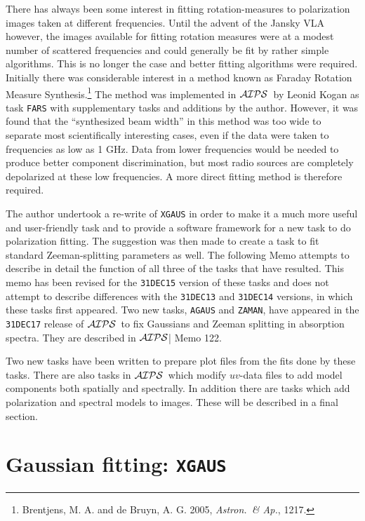 \documentclass[twoside]{article}
\newcommand{\Hi}[1]{\textcolor{hicol}{#1}}
\newcommand{\AIPS}{{$\cal AIPS\/$}}
\newcommand{\keyw}[1]{\hbox{{\tt #1}}}
\begin{document}
There has always been some interest in fitting rotation-measures to
polarization images taken at different frequencies.  Until the advent
of the Jansky VLA however, the images available for fitting rotation
measures were at a modest number of scattered frequencies and could
generally be fit by rather simple algorithms.  This is no longer the
case and better fitting algorithms were required.  Initially there was
considerable interest in a method known as Faraday Rotation Measure
Synthesis.\footnote{Brentjens, M. A. and de Bruyn, A. G. 2005, {\it
Astron.\ \& Ap.}, 1217.}  The method was implemented in \AIPS\ by
Leonid Kogan as task \keyw{FARS} with supplementary tasks and
additions by the author.  However, it was found that the ``synthesized
beam width'' in this method was too wide to separate most
scientifically interesting cases, even if the data were taken to
frequencies as low as 1 GHz.  Data from lower frequencies would be
needed to produce better component discrimination, but most radio
sources are completely depolarized at these low frequencies.  A more
direct fitting method is therefore required.

The author undertook a re-write of \keyw{XGAUS} in order to make it a
much more useful and user-friendly task and to provide a software
framework for a new task to do polarization fitting.  The suggestion
was then made to create a task to fit standard Zeeman-splitting
parameters as well.  The following Memo attempts to describe in detail
the function of all three of the tasks that have resulted.  This memo
\Hi{has been revised for the {\tt 31DEC15}} version of these tasks and
does not attempt to describe differences with the {\tt 31DEC13}
\Hi{and {\tt 31DEC14} versions}, in which these tasks first appeared.
\Hi{Two new tasks, {\tt AGAUS} and {\tt ZAMAN}, have appeared in the
  {\tt 31DEC17} release of \AIPS\ to fix Gaussians and Zeeman
  splitting in absorption spectra.  They are described in \AIPS| Memo
  122.}

\Hi{Two new tasks have been written to prepare plot files from the
fits done by these tasks.}  There are also tasks in \AIPS\ which
modify $uv$-data files to add model components both spatially and
spectrally.  In addition there are tasks which add polarization and
spectral models to images.  These will be described in a final
section.

\section{Gaussian fitting: {\tt XGAUS}}
\end{document}
